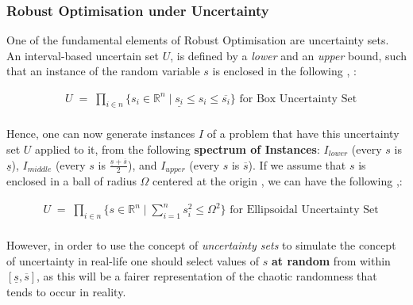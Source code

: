 
\subsubsection*{Robust Optimisation under Uncertainty}
One of the fundamental elements of Robust Optimisation are uncertainty sets. An interval-based uncertain set $U$, is defined by a \textit{lower} and an \textit{upper} bound, such that an instance of the random variable $s$ is enclosed in the following \cite{Bertsimas2011TheoryAA}, \cite{robustuncertainty}:

\vspace{\baselineskip}
\begin{equation}
\begin{aligned}
& U \; = \; \prod_{i\in n} \{s_i \in \mathbb{R}^{n} \; | \; \underline{s_i} \leq s_i \leq  \overline{s_i}\} \text{    for Box Uncertainty Set} \\
\end{aligned}
\end{equation}

\vspace{\baselineskip}
\noindent
Hence, one can now generate instances $I$ of a problem that have this uncertainty set $U$ applied to it, from the following \textbf{spectrum of Instances}: $I_{lower}$ (every $s$ is $\underline{s}$), $I_{middle}$ (every $s$ is $\frac{\underline{s}+\overline{s}}{2}$), and $I_{upper}$ (every $s$ is $\overline{s}$). If we assume that $s$ is enclosed in a ball of radius $\Omega$ centered at the origin \cite{robustoptimisation}, we can have the following \cite{christodoulos},\cite{GORISSEN2015124}:

\vspace{\baselineskip}
\begin{equation}
\begin{aligned}
& U \; = \; \prod_{i\in n} \{s \in \mathbb{R}^{n} \; | \; \sum _{i=1}^{n}s_{i}^2  \leq  \Omega^2 \} \text{    for Ellipsoidal Uncertainty Set} \\
\end{aligned}
\end{equation}

\vspace{\baselineskip}
\noindent
However, in order to use the concept of \textit{uncertainty sets} to simulate the concept of uncertainty in real-life one should select values of $s$ \textbf{at random} from within $[\underline{s},\overline{s}]$, as this will be a fairer representation of the chaotic randomness that tends to occur in reality.

